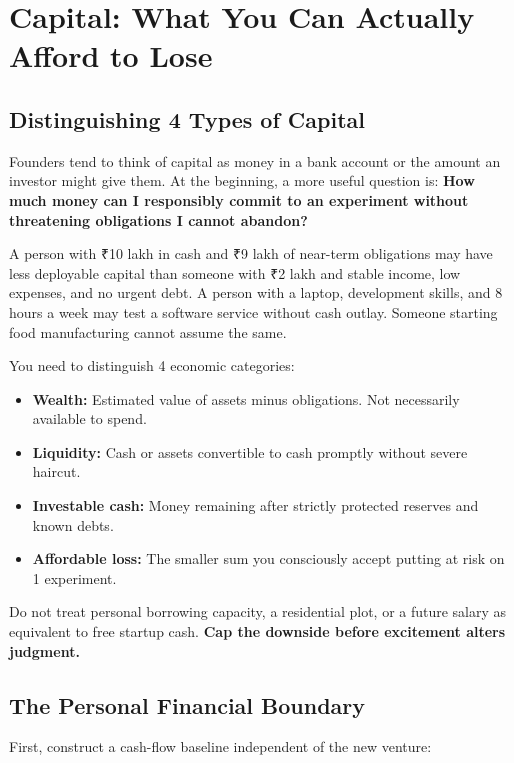 \section{Capital: What You Can Actually Afford to Lose}

\subsection{Distinguishing 4 Types of Capital}

Founders tend to think of capital as money in a bank account or the amount an investor might give them. At the beginning, a more useful question is: \textbf{How much money can I responsibly commit to an experiment without threatening obligations I cannot abandon?}

A person with ₹10 lakh in cash and ₹9 lakh of near-term obligations may have less deployable capital than someone with ₹2 lakh and stable income, low expenses, and no urgent debt. A person with a laptop, development skills, and 8 hours a week may test a software service without cash outlay. Someone starting food manufacturing cannot assume the same.

You need to distinguish 4 economic categories:

\begin{itemize}[leftmargin=11pt,itemsep=1.5pt,topsep=1.5pt,parsep=0pt]
  \item \textbf{Wealth:} Estimated value of assets minus obligations. Not necessarily available to spend.
  \item \textbf{Liquidity:} Cash or assets convertible to cash promptly without severe haircut.
  \item \textbf{Investable cash:} Money remaining after strictly protected reserves and known debts.
  \item \textbf{Affordable loss:} The smaller sum you consciously accept putting at risk on 1 experiment.
\end{itemize}

Do not treat personal borrowing capacity, a residential plot, or a future salary as equivalent to free startup cash. \textbf{Cap the downside before excitement alters judgment.}

\subsection{The Personal Financial Boundary}

First, construct a cash-flow baseline independent of the new venture:

